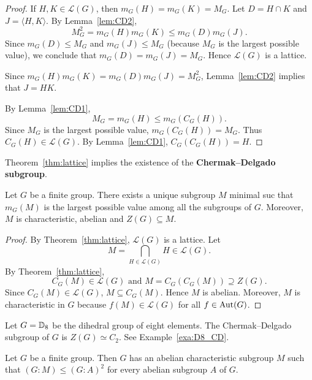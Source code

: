 \begin{proof}
	If $H,K\in\mathcal{L}(G)$, then $m_G(H)=m_G(K)=M_G$. Let $D=H\cap K$ and $J=\langle
	H,K\rangle$. By Lemma~\ref{lem:CD2}, 
	\[
		M_G^2=m_G(H)m_G(K)\leq m_G(D)m_G(J).
	\]
	Since $m_G(D)\leq M_G$ and $m_G(J)\leq M_G$ (because $M_G$ is the largest possible value), we conclude that $m_G(D)=m_G(J)=M_G$. Hence $\mathcal{L}(G)$ is a lattice. 

	Since $m_G(H)m_G(K)=m_G(D)m_G(J)=M_G^2$, Lemma~\ref{lem:CD2} implies that 
	$J=HK$. 

	By Lemma~\ref{lem:CD1}, 
	\[
	M_G=m_G(H)\leq m_G(C_G(H)).
	\]
	Since $M_G$ is the largest possible value, $m_G(C_G(H))=M_G$. Thus 
    $C_G(H)\in\mathcal{L}(G)$.  By Lemma~\ref{lem:CD1}, $C_G(C_G(H))=H$.
\end{proof}

Theorem~\ref{thm:lattice} implies the existence 
of the \textbf{Chermak--Delgado subgroup}.

\begin{corollary}
	\label{cor:ChermakDelgado}
	Let $G$ be a finite group. There exists a unique subgroup $M$ minimal 
    suc that $m_G(M)$ is the largest possible value among all the subgroups 
    of $G$. Moreover, $M$ is characteristic, abelian and $Z(G)\subseteq M$. 
\end{corollary}


\begin{proof}
	By Theorem~\ref{thm:lattice}, $\mathcal{L}(G)$ is a lattice. Let 
	\[
		M=\bigcap_{H\in\mathcal{L}(G)}H\in\mathcal{L}(G).
	\]
	By Theorem~\ref{thm:lattice},  
	\[
    C_G(M)\in\mathcal{L}(G)
    \text{ and }M=C_G(C_G(M))\supseteq Z(G).
    \]Since $C_G(M)\in\mathcal{L}(G)$, $M\subseteq C_G(M)$. Hence $M$ is abelian. Moreover, $M$ is characteristic in $G$ because $f(M)\in\mathcal{L}(G)$
	for all $f\in\operatorname{Aut}(G)$.
\end{proof}

\begin{example}
	Let $G=\mathbb{D}_8$ be the dihedral group of eight elements. The Chermak--Delgado subgroup of $G$ is $Z(G)\simeq C_2$. See Example~\ref{exa:D8_CD}.
\end{example}

\begin{theorem}
 	\label{thm:ChermakDelgado}
	Let $G$ be a finite group. Then $G$ has an abelian characteristic subgroup $M$ such that $(G:M)\leq (G:A)^2$ for every abelian subgroup 
	$A$ of $G$. 
\end{theorem}


